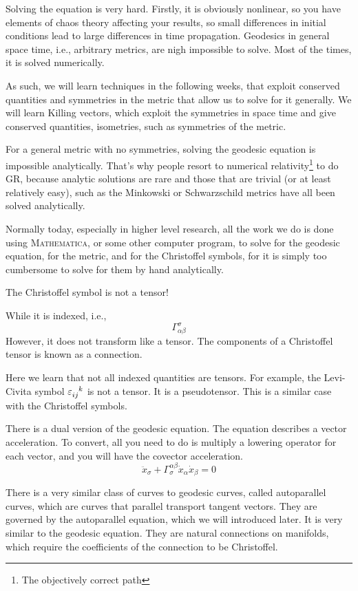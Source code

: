 	Solving the equation is very hard. Firstly, it is obviously
	nonlinear, so you have elements of chaos theory affecting your results,
	so small differences in initial conditions lead to large differences
	in time propagation.
	Geodesics in general space time, i.e., arbitrary metrics, are 
	nigh impossible to solve. Most of the times, it is solved numerically.

	As such, we will learn techniques in the following weeks,
	that exploit conserved quantities and symmetries in the metric
	that allow us to solve for it generally. We will learn Killing vectors,
	which exploit the symmetries in space time and give conserved
	quantities, isometries, such as symmetries of the metric.
	
	For a general metric with no symmetries, solving the 
	geodesic equation is impossible analytically. That's 
	why people resort to numerical relativity\footnote{The 
	objectively correct path} to do GR, because analytic solutions
	are rare and those that are trivial (or at least relatively easy),
	such as the Minkowski or Schwarzschild metrics have all been solved
	analytically. 

	Normally today, especially in higher level research, all the work we do 
	is done using \textsc{Mathematica}, or some other 
	computer program, to solve for the geodesic equation,
	for the metric, and for the Christoffel symbols, for it is simply too 
	cumbersome to solve for them by hand analytically.
	
	\begin{remark}
	    The Christoffel symbol is not a tensor!
		
		\hspace{1em}
		While it is indexed, i.e.,
		\[
			\Gamma^\sigma_{\alpha\beta}
		\]
		However, it does not transform like a tensor. 
		The components of a Christoffel tensor is 
		known as a connection.

		\hspace{1em}Here we learn that not all indexed quantities are 
		tensors. For example, the Levi-Civita symbol 
		$\varepsilon\indices{_{ij}^k}$
		is not a tensor. It is a pseudotensor.
		This is a similar case with the Christoffel symbols.
	\end{remark}

	\begin{remark}
		There is a dual version of the geodesic equation. The equation describes a vector acceleration. To convert, all you need to do is
		multiply a lowering operator for each vector, and you will have the covector acceleration.
		\begin{equation}
			\label{eq:geodesic-eqn-dual}
			\ddot{x}_\sigma 
			+
			\Gamma^{\alpha\beta}_\sigma
			\dot{x}_\alpha
			\dot{x}_\beta
			=0
		\end{equation}
	\end{remark}
	There is a very similar class of curves to geodesic curves, called autoparallel curves, which 
	are curves that parallel transport tangent vectors. They are governed
	by the autoparallel equation, which we will introduced later. It is very similar to the geodesic equation. They
	are natural connections on manifolds, which require the coefficients
	of the connection to be Christoffel. 

